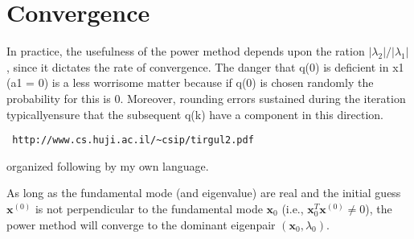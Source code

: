 \section{Convergence}

In practice, the usefulness of the power method depends upon the ration $|\lambda_2|/|\lambda_1|$, since it dictates the rate of convergence. 
The danger that q(0) is deficient in x1 (a1 = 0) is a less worrisome matter because if q(0) is chosen randomly the probability for this is 0. 
Moreover, rounding errors sustained during the iteration typicallyensure that the subsequent q(k) have a component in this direction.\begin{verbatim} http://www.cs.huji.ac.il/~csip/tirgul2.pdf\end{verbatim}

organized following by my own language.

As long as the fundamental mode (and eigenvalue) are real and the initial guess $\mathbf{x}^{(0)}$ is not perpendicular to the fundamental mode $\mathbf{x}_0$ (i.e., $\mathbf{x}^T_0\mathbf{x}^{(0)} \neq 0$), the power method will converge to the dominant eigenpair $(\mathbf{x}_0, \lambda_0)$.

